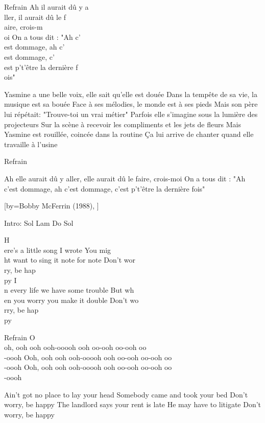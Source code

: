 \beginverse
Refrain
Ah il aurait dû y a\\[Lam]ller, il aurait dû le f\\[Rém]aire, crois-m\\[Lam]oi
On a tous dit : "Ah c'\\[Lam]est dommage, ah c'\\[Rém]est dommage, c'\\[Sol7]est p't'être la dernière f\\[Lam]ois"
\endverse

\beginverse
Yasmine a une belle voix, elle sait qu'elle est douée
Dans la tempête de sa vie, la musique est sa bouée
Face à ses mélodies, le monde est à ses pieds
Mais son père lui répétait: "Trouve-toi un vrai métier"
Parfois elle s'imagine sous la lumière des projecteurs
Sur la scène à recevoir les compliments et les jets de fleurs
Mais Yasmine est rouillée, coincée dans la routine
Ça lui arrive de chanter quand elle travaille à l'usine
\endverse

\beginverse
Refrain
\endverse

\beginverse
Ah elle aurait dû y aller, elle aurait dû le faire, crois-moi
On a tous dit : "Ah c'est dommage, ah c'est dommage, c'est p't'être la dernière fois"
\\[bis]
\endverse

[by={Bobby McFerrin (1988), }]

\beginverse
Intro: Sol Lam Do Sol 
\endverse

\beginverse
H\\[Sol]ere's a little song I wrote 
You mig\\[Lam]ht want to sing it note for note 
Don't wor\\[Do]ry, be hap\\[Sol]py
I\\[Sol]n every life we have some trouble
But wh\\[lam]en you worry you make it double 
Don't wo\\[Do]rry, be hap\\[Sol]py
\endverse

\beginverse
Refrain
O\\[Sol]oh, ooh ooh ooh-ooooh ooh oo-ooh oo-ooh oo\\[Lam]-oooh
Ooh, ooh ooh ooh-ooooh ooh oo-ooh oo-ooh oo\\[Do]-oooh
Ooh, ooh ooh ooh-ooooh ooh oo-ooh oo-ooh oo\\[Sol]-oooh
\endverse

\beginverse
Ain’t got no place to lay your head
Somebody came and took your bed
Don’t worry, be happy
The landlord says your rent is late
He may have to litigate
Don’t worry, be happy
\endverse

